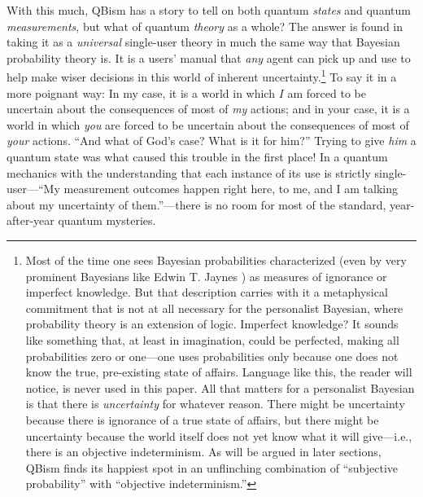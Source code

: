 With this much, QBism has a story to tell on both quantum {\it states\/} and quantum {\it measurements}, but what of quantum {\it theory\/} as a whole?  The answer is found in taking it as a {\it universal\/} single-user theory in much the same way that Bayesian probability theory is.  It is a users' manual that {\it any\/} agent can pick up and use to help make wiser decisions in this world of inherent uncertainty.\footnote{\label{Macca} Most of the time one sees Bayesian probabilities characterized (even by very prominent Bayesians like Edwin T. Jaynes \cite{Jaynes03}) as measures of ignorance or imperfect knowledge.  But that description carries with it a metaphysical commitment that is not at all necessary for the personalist Bayesian, where probability theory is an extension of logic.  Imperfect knowledge?  It sounds like something that, at least in imagination, could be perfected, making all probabilities zero or one---one uses probabilities only because one does not know the true, pre-existing state of affairs.  Language like this, the reader will notice, is never used in this paper.  All that matters for a personalist Bayesian is that there is {\it uncertainty\/} for whatever reason.  There might be uncertainty because there is ignorance of a true state of affairs, but there might be uncertainty because the world itself does not yet know what it will give---i.e., there is an objective indeterminism.  As will be argued in later sections, QBism finds its happiest spot in an unflinching combination of ``subjective probability'' with ``objective indeterminism.''}  To say it in a more poignant way:  In my case, it is a world in which $I$ am forced to be uncertain about the consequences of most of {\it my\/} actions; and in your case, it is a world in which {\it you\/} are forced to be uncertain about the consequences of most of {\it your\/} actions.  ``And what of God's case?  What is it for him?''  Trying to give {\it him\/} a quantum state was what caused this trouble in the first place!  In a quantum mechanics with the understanding that each instance of its use is strictly single-user---``My measurement outcomes happen right here, to me, and I am talking about my uncertainty of them.''---there is no room for most of the standard, year-after-year quantum mysteries.

